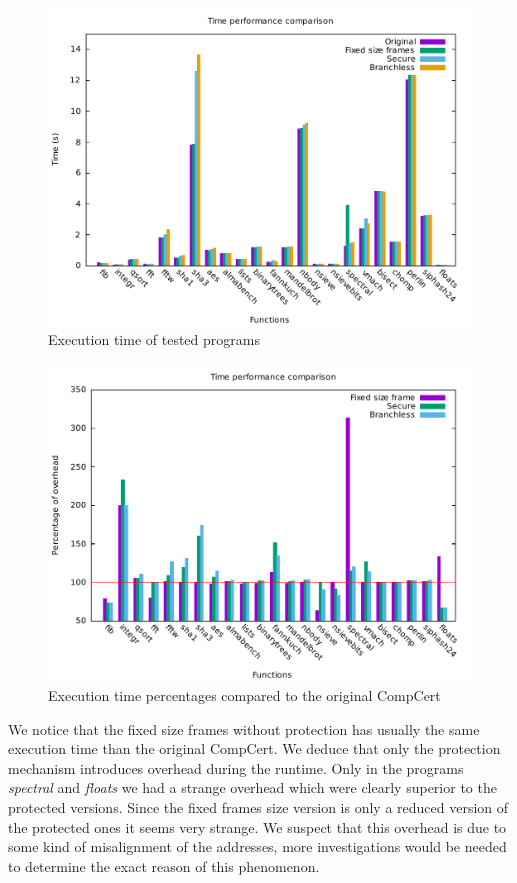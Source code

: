 \documentclass[11pt]{sdm}
\begin{document}
\begin{figure}[!ht]
\centering
\includegraphics[width=1\textwidth]{images/time_graph.pdf}
\caption{Execution time of tested programs}
\label{time_graph}
\end{figure}

\begin{figure}[!ht]
\centering
\includegraphics[width=1\textwidth]{images/time_percentage_graph.pdf}
\caption{Execution time percentages compared to the original CompCert}
\label{time_percentage_graph}
\end{figure}

We notice that the fixed size frames without protection has usually the same execution time than the original CompCert. 
We deduce that only the protection mechanism introduces overhead during the runtime.
Only in the programs \textit{spectral} and \textit{floats} we had a strange overhead which were clearly superior to the protected versions. 
Since the fixed frames size version is only a reduced version of the protected ones it seems very strange. We suspect that this overhead is due to some kind of misalignment of the addresses, more investigations would be needed to determine the exact reason of this phenomenon.
\end{document}
